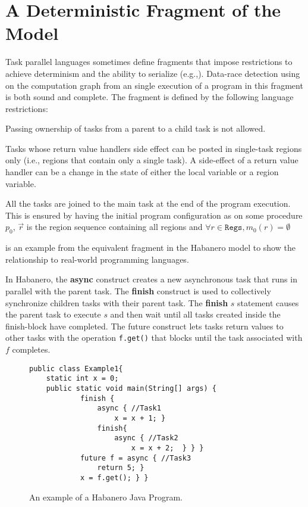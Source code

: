 \section{A Deterministic Fragment of the Model}
\label{sec:otf-drd}
Task parallel languages sometimes define fragments that impose restrictions to achieve determinism and the ability to serialize (e.g.,\cite{cave2011habanero}). Data-race detection using  on the computation graph from an single execution of a program in this fragment is both sound and complete. The fragment is defined by the following language restrictions:
\begin{compactitem}
\item Passing ownership of tasks from a parent to a child task is not allowed. 
\item Tasks whose return value handlers side effect can be posted in single-task regions only (i.e., regions that contain only a single task). A side-effect of a return value handler can be a change in the state of either the local variable or a region variable. 
\item All the tasks are joined to the main task at the end of the program execution. This is ensured by having the initial program configuration as  on some procedure $p_0$, $\vec{r}$ is the region sequence containing all regions and $\forall r \in \mathtt{Regs}, m_0(r) = \emptyset$
\end{compactitem}
 is an example from the equivalent fragment in the Habanero model to show the relationship to real-world programming languages. 

In Habanero, the \textbf{async} construct creates a new asynchronous task that runs in parallel with the parent task. The \textbf{finish} construct is used to collectively synchronize children tasks with their parent task. The \textbf{finish} $s$ statement causes the parent task to execute $s$ and then wait until all tasks created inside the finish-block have completed. The future construct lets tasks return values to other tasks with the operation \texttt{f.get()} that blocks until the task associated with $f$ completes. 

\begin{figure}
  \begin{center}
\begin{lstlisting}
public class Example1{
	static int x = 0;
	public static void main(String[] args) {
			finish {
				async { //Task1
					x = x + 1; }
				finish{
					async { //Task2
						x = x + 2;  } } }
			future f = async { //Task3
				return 5; }
			x = f.get(); } }
\end{lstlisting}
  \end{center}
  \vspace{-2em}
  \caption{An example of a Habanero Java Program.}
   \vspace{-2em}
  \label{fig:hj-async-fin}
\end{figure}

